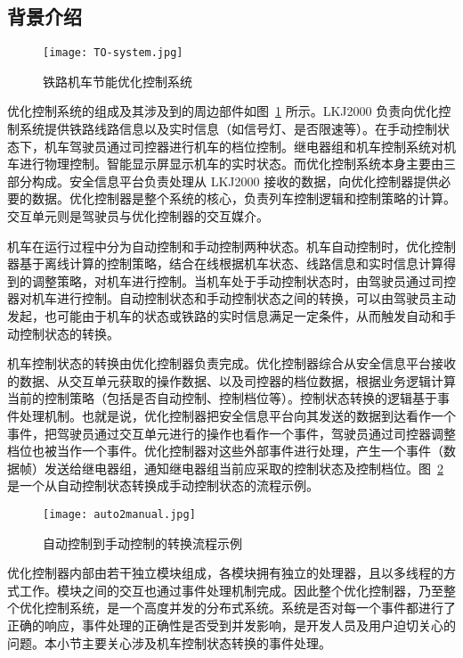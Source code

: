 \subsection{背景介绍}

\begin{figure}[ht]
\centering
\texttt{[image: TO-system.jpg]}
\caption{铁路机车节能优化控制系统}
\label{f:TO-system}
\end{figure}

优化控制系统的组成及其涉及到的周边部件如图~\ref{f:TO-system} 所示。LKJ2000 负责向优化控制系统提供铁路线路信息以及实时信息（如信号灯、是否限速等）。在手动控制状态下，机车驾驶员通过司控器进行机车的档位控制。继电器组和机车控制系统对机车进行物理控制。智能显示屏显示机车的实时状态。而优化控制系统本身主要由三部分构成。安全信息平台负责处理从 LKJ2000 接收的数据，向优化控制器提供必要的数据。优化控制器是整个系统的核心，负责列车控制逻辑和控制策略的计算。交互单元则是驾驶员与优化控制器的交互媒介。

机车在运行过程中分为自动控制和手动控制两种状态。机车自动控制时，优化控制器基于离线计算的控制策略，结合在线根据机车状态、线路信息和实时信息计算得到的调整策略，对机车进行控制。当机车处于手动控制状态时，由驾驶员通过司控器对机车进行控制。自动控制状态和手动控制状态之间的转换，可以由驾驶员主动发起，也可能由于机车的状态或铁路的实时信息满足一定条件，从而触发自动和手动控制状态的转换。

机车控制状态的转换由优化控制器负责完成。优化控制器综合从安全信息平台接收的数据、从交互单元获取的操作数据、以及司控器的档位数据，根据业务逻辑计算当前的控制策略（包括是否自动控制、控制档位等）。控制状态转换的逻辑基于事件处理机制。也就是说，优化控制器把安全信息平台向其发送的数据到达看作一个事件，把驾驶员通过交互单元进行的操作也看作一个事件，驾驶员通过司控器调整档位也被当作一个事件。优化控制器对这些外部事件进行处理，产生一个事件（数据帧）发送给继电器组，通知继电器组当前应采取的控制状态及控制档位。图~\ref{f:auto2manual} 是一个从自动控制状态转换成手动控制状态的流程示例。

\begin{figure}[ht]
\centering
\texttt{[image: auto2manual.jpg]}
\caption{自动控制到手动控制的转换流程示例}
\label{f:auto2manual}
\end{figure}

优化控制器内部由若干独立模块组成，各模块拥有独立的处理器，且以多线程的方式工作。模块之间的交互也通过事件处理机制完成。因此整个优化控制器，乃至整个优化控制系统，是一个高度并发的分布式系统。系统是否对每一个事件都进行了正确的响应，事件处理的正确性是否受到并发影响，是开发人员及用户迫切关心的问题。本小节主要关心涉及机车控制状态转换的事件处理。


